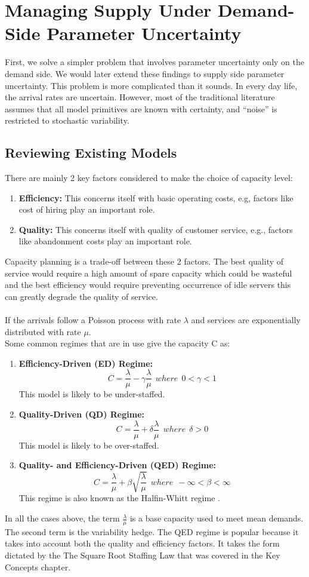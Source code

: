 \chapter{Managing Supply Under Demand-Side Parameter Uncertainty}

First, we solve a simpler problem that involves parameter uncertainty only on the demand side. We would later extend these findings to supply side parameter uncertainty. This problem is more complicated than it sounds. In every day life, the arrival rates are uncertain. However, most of the traditional literature assumes that all model primitives are known with certainty, and “noise” is restricted to stochastic variability. 

\section{Reviewing Existing Models}
There are mainly 2 key factors considered to make the choice of capacity level: 
\begin{enumerate}
  \item \textbf{Efficiency:} This concerns itself with basic operating costs, e.g, factors like cost of hiring play an important role.
  \item \textbf{Quality:} This concerns itself with quality of customer service, e.g., factors like abandonment costs play an important role. 
\end{enumerate}
 
 Capacity planning is a trade-off between these 2 factors. The best quality of service would require a high amount of spare capacity which could be wasteful and the best efficiency would require preventing occurrence of idle servers this can greatly degrade the quality of service. \\ \\
If the arrivals follow a Poisson process with rate $\lambda$ and services are exponentially distributed with rate $\mu$. \\
Some common regimes that are in use give the capacity C as:
\begin{enumerate}
  \item \textbf{Efficiency-Driven (ED) Regime:}
  \[ C = \frac{\lambda}{\mu} - \gamma\frac{\lambda}{\mu} \ \ where \ \ 0 < \gamma < 1\]
  This model is likely to be under-staffed.
  \item \textbf{Quality-Driven (QD) Regime:} 
  \[ C = \frac{\lambda}{\mu} + \delta\frac{\lambda}{\mu} \ \ where \ \ \delta >0\]
  This model is likely to be over-staffed.
  \item \textbf{Quality- and Efficiency-Driven (QED) Regime:} 
  \[ C = \frac{\lambda}{\mu} + \beta\sqrt{\frac{\lambda}{\mu}} \ \ where \ \ -\infty<\beta<\infty\]
  This regime is also known as the Halfin-Whitt regime \cite{qedRegime}.
\end{enumerate}
In all the cases above, the term $\frac{\lambda}{\mu}$ is a base capacity used to meet mean demands. The second term is the variability hedge. The QED regime is popular because it takes into account both the quality and efficiency factors. It takes the form dictated by the The Square Root Staffing Law that was covered in the Key Concepts chapter. \\

